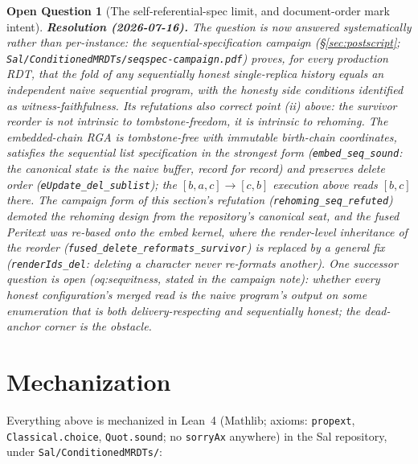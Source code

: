 \documentclass[11pt]{article}
\newtheorem{openq}[theorem]{Open Question}
\newcommand{\lean}[1]{\texttt{#1}}
\begin{document}
\begin{openq}[The self-referential-spec limit, and document-order mark intent]
\medskip\noindent\textbf{Resolution (2026-07-16).} The question is now
answered systematically rather than per-instance: the
sequential-specification campaign (\S\ref{sec:postscript};
\lean{Sal/ConditionedMRDTs/seqspec-campaign.pdf}) proves, for every
production RDT, that the fold of any sequentially honest single-replica
history equals an independent naive sequential program, with the honesty
side conditions identified as witness-faithfulness. Its refutations also
\emph{correct} point (ii) above: the survivor reorder is not intrinsic to
tombstone-freedom, it is intrinsic to \emph{rehoming}. The embedded-chain
RGA is tombstone-free with immutable birth-chain coordinates, satisfies
the sequential list specification in the strongest form
(\lean{embed\_seq\_sound}: the canonical state is the naive buffer,
record for record) and preserves delete order
(\lean{eUpdate\_del\_sublist}); the $[b,a,c]\!\to\![c,b]$ execution above
reads $[b,c]$ there. The campaign form of this section's refutation
(\lean{rehoming\_seq\_refuted}) demoted the rehoming design from the
repository's canonical seat, and the fused Peritext was re-based onto the
embed kernel, where the render-level inheritance of the reorder
(\lean{fused\_delete\_reformats\_survivor}) is replaced by a general fix
(\lean{renderIds\_del}: deleting a character never re-formats another).
One successor question is open (oq:seqwitness, stated in the campaign
note): whether every honest configuration's merged read is the naive
program's output on some enumeration that is both delivery-respecting and
sequentially honest; the dead-anchor corner is the obstacle.
\end{openq}

\section{Mechanization}
\label{sec:mech}

Everything above is mechanized in Lean~4 (Mathlib; axioms:
\lean{propext}, \lean{Classical.choice}, \lean{Quot.sound}; no
\lean{sorryAx} anywhere) in the Sal repository, under
\lean{Sal/ConditionedMRDTs/}:
\end{document}
